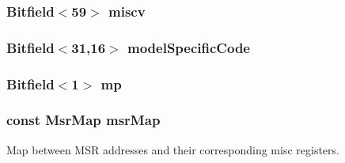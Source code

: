 \label{namespaceX86ISA_a7872f9c6a86e22c69210d82a4c09a1d9}
\hypertarget{namespaceX86ISA_a7adf7e0e63afd7388be4d5c641d924eb}{
\subsubsection[{miscv}]{\setlength{\rightskip}{0pt plus 5cm}Bitfield$<$59$>$ {\bf miscv}}}
\label{namespaceX86ISA_a7adf7e0e63afd7388be4d5c641d924eb}
\hypertarget{namespaceX86ISA_a4b97eb97db2365148a5c3a5070f0cdd1}{
\subsubsection[{mod}]{}}
\label{namespaceX86ISA_a4b97eb97db2365148a5c3a5070f0cdd1}
\hypertarget{namespaceX86ISA_a1da3c4f49e3bc5abd45b8241bb4e90ee}{
\subsubsection[{modelSpecificCode}]{\setlength{\rightskip}{0pt plus 5cm}Bitfield$<$31,16$>$ {\bf modelSpecificCode}}}
\label{namespaceX86ISA_a1da3c4f49e3bc5abd45b8241bb4e90ee}
\hypertarget{namespaceX86ISA_a55c6443d5217f304a354dbbc1d68104d}{
\subsubsection[{mp}]{\setlength{\rightskip}{0pt plus 5cm}Bitfield$<$1$>$ {\bf mp}}}
\label{namespaceX86ISA_a55c6443d5217f304a354dbbc1d68104d}
\hypertarget{namespaceX86ISA_a668a095a9f8f9c629c5b12ff0bb8a721}{
\subsubsection[{msrMap}]{\setlength{\rightskip}{0pt plus 5cm}const {\bf MsrMap} {\bf msrMap}}}
\label{namespaceX86ISA_a668a095a9f8f9c629c5b12ff0bb8a721}
Map between MSR addresses and their corresponding misc registers.

